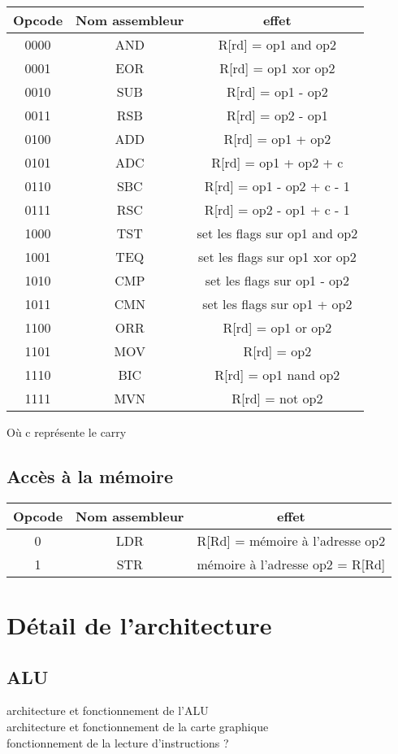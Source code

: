 \documentclass[a4paper]{article}
\begin{document}
\begin{tabular}{|c|c|c|}
  \hline
  Opcode & Nom assembleur & effet \\
  \hline
  0000 & AND & R[rd] = op1 and op2\\
  0001 & EOR & R[rd] = op1 xor op2\\
  0010 & SUB & R[rd] = op1 - op2\\
  0011 & RSB & R[rd] = op2 - op1\\
  0100 & ADD & R[rd] = op1 + op2\\
  0101 & ADC & R[rd] = op1 + op2 + c\\
  0110 & SBC & R[rd] = op1 - op2 + c - 1\\
  0111 & RSC & R[rd] = op2 - op1 + c - 1\\
  1000 & TST & set les flags sur op1 and op2\\
  1001 & TEQ & set les flags sur op1 xor op2\\
  1010 & CMP & set les flags sur op1 - op2\\
  1011 & CMN & set les flags sur op1 + op2\\
  1100 & ORR & R[rd] = op1 or op2\\
  1101 & MOV & R[rd] = op2\\
  1110 & BIC & R[rd] = op1 nand op2\\
  1111 & MVN & R[rd] = not op2\\
  \hline
\end{tabular}

Où c représente le carry

\subsection{Accès à la mémoire}

\begin{tabular}{|c|c|c|}
  \hline
  Opcode & Nom assembleur & effet\\
  \hline
  0 & LDR & R[Rd] = mémoire à l'adresse op2\\
  1 & STR & mémoire à l'adresse op2 = R[Rd]\\
  \hline
            
\end{tabular}

\section{Détail de l'architecture}

\subsection{ALU}



architecture et fonctionnement de l'ALU\\
architecture et fonctionnement de la carte graphique\\
fonctionnement de la lecture d'instructions ?
\end{document}
